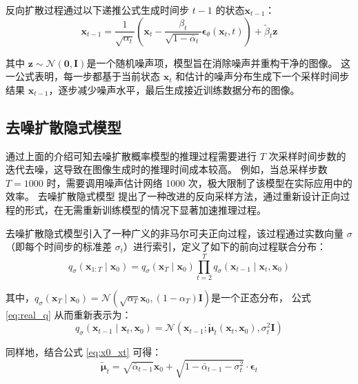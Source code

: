 反向扩散过程通过以下递推公式生成时间步 $t-1$ 的状态$\mathbf{x}_{t-1}$：
\begin{equation}
    \mathbf{x}_{t-1}=\frac{1}{\sqrt{\alpha_t}}\left(\mathbf{x}_t-\frac{\beta_t}{\sqrt{1-\bar{\alpha}_t}} \boldsymbol{\epsilon}_\theta\left(\mathbf{x}_t, t\right)\right)+\tilde{\beta}_t \boldsymbol{z}
\end{equation}

其中 $\boldsymbol{z} \sim \mathcal{N}(\mathbf{0}, \mathbf{I})$是一个随机噪声项，模型旨在消除噪声并重构干净的图像。
这一公式表明，每一步都基于当前状态 $\mathbf{x}_t$ 和估计的噪声分布生成下一个采样时间步结果 $\mathbf{x}_{t-1}$，逐步减少噪声水平，最后生成接近训练数据分布的图像。

\subsection{去噪扩散隐式模型}
通过上面的介绍可知去噪扩散概率模型的推理过程需要进行 $T$ 次采样时间步数的迭代去噪，这导致在图像生成时的推理时间成本较高。
例如，当总采样步数 $T=1000$ 时，需要调用噪声估计网络 1000 次，极大限制了该模型在实际应用中的效率。
去噪扩散隐式模型\cite{improved_ddpm}\cite{ddim} 提出了一种改进的反向采样方法，通过重新设计正向过程的形式，在无需重新训练模型的情况下显著加速推理过程。

去噪扩散隐式模型引入了一种广义的非马尔可夫正向过程，该过程通过实数向量 $\sigma$ （即每个时间步的标准差 $\sigma_t$）进行索引，定义了如下的前向过程联合分布：
\begin{equation}
    q_\sigma\left(\mathbf{x}_{1: T} \mid \mathbf{x}_0\right)=q_\sigma\left(\mathbf{x}_T \mid \mathbf{x}_0\right) \prod_{t=2}^T q_\sigma\left(\mathbf{x}_{t-1} \mid \mathbf{x}_t, \mathbf{x}_0\right)
\end{equation}

其中，$q_\sigma\left(\boldsymbol{x}_T \mid \boldsymbol{x}_0\right)=\mathcal{N}\left(\sqrt{\alpha_T} \boldsymbol{x}_0,\left(1-\alpha_T\right) \boldsymbol{I}\right)$是一个正态分布， 公式 \eqref{eq:real_q} 从而重新表示为：
\begin{equation}
    q_\sigma\left(\mathbf{x}_{t-1} \mid \mathbf{x}_t, \mathbf{x}_0\right)=\mathcal{N}\left(\mathbf{x}_{t-1} ; \tilde{\boldsymbol{\mu}}_t\left(\mathbf{x}_t, \mathbf{x}_0\right), \sigma_t^2 \mathbf{I}\right)
\end{equation}

同样地，结合公式 \eqref{eq:x0_xt} 可得：
\begin{equation}
    \tilde{\boldsymbol{\mu}}_t=\sqrt{\bar{\alpha}_{t-1}} \mathbf{x}_0+\sqrt{1-\bar{\alpha}_{t-1}-\sigma_t^2} \cdot \boldsymbol{\epsilon}_t
\end{equation}

